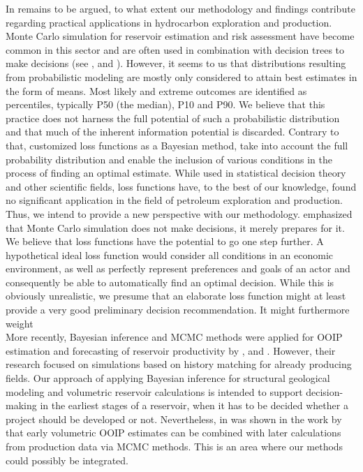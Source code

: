 	In remains to be argued, to what extent our methodology and findings contribute regarding practical applications in hydrocarbon exploration and production. Monte Carlo simulation for reservoir estimation and risk assessment have become common in this sector and are often used in combination with decision trees to make decisions (see \citet{murtha1997monte}, \citet{mudford2000valuing} and \citet{bratvold2010making}). However, it seems to us that distributions resulting from probabilistic modeling are mostly only considered to attain best estimates in the form of means. Most likely and extreme outcomes are identified as percentiles, typically P50 (the median), P10 and P90. We believe that this practice does not harness the full potential of such a probabilistic distribution and that much of the inherent information potential is discarded. Contrary to that, customized loss functions as a Bayesian method, take into account the full probability distribution and enable the inclusion of various conditions in the process of finding an optimal estimate. While used in statistical decision theory and other scientific fields, loss functions have, to the best of our knowledge, found no significant application in the field of petroleum exploration and production. Thus, we intend to provide a new perspective with our methodology. \citet{murtha1997monte} emphasized that Monte Carlo simulation does not make decisions, it merely prepares for it. We believe that loss functions have the potential to go one step further. A hypothetical ideal loss function would consider all conditions in an economic environment, as well as perfectly represent preferences and goals of an actor and consequently be able to automatically find an optimal decision. While this is obviously unrealistic, we presume that an elaborate loss function might at least provide a very good preliminary decision recommendation. It might furthermore weight \\
	More recently, Bayesian inference and MCMC methods were applied for OOIP estimation and forecasting of reservoir productivity by \citet{wadsley2005markov}, \citet{ma2006multistage} and \citet{liu2010continuous}. However, their research focused on simulations based on history matching for already producing fields. Our approach of applying Bayesian inference for structural geological modeling and volumetric reservoir calculations is intended to support decision-making in the earliest stages of a reservoir, when it has to be decided whether a project should be developed or not. Nevertheless, in was shown in the work by \citet{wadsley2005markov} that early volumetric OOIP estimates can be combined with later calculations from production data via MCMC methods. This is an area where our methods could possibly be integrated.\\
